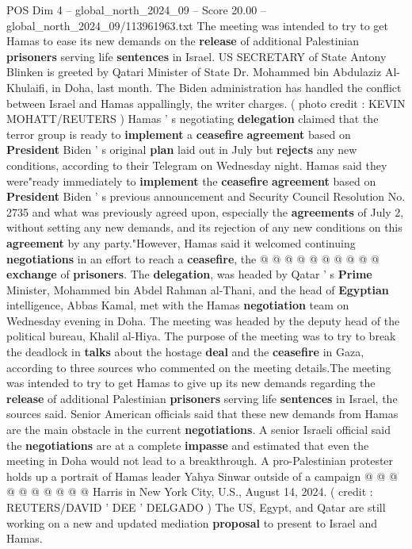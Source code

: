 \begin{textsample}{POS Dim 4 – global\_north\_2024\_09 – Score 20.00 – global\_north\_2024\_09/113961963.txt}  \label{ex:f4_pos_315}
The meeting was intended to try to get Hamas to ease its new demands on the \textbf{release} of additional Palestinian \textbf{prisoners} serving life \textbf{sentences} in Israel.
US SECRETARY of State Antony Blinken is greeted by Qatari Minister of State Dr.
Mohammed bin Abdulaziz Al-Khulaifi, in Doha, last month.
The Biden administration has handled the conflict between Israel and Hamas appallingly, the writer charges. ( photo credit : KEVIN MOHATT/REUTERS ) Hamas ' s negotiating \textbf{delegation} claimed that the terror group is ready to \textbf{implement} a \textbf{ceasefire} \textbf{agreement} based on \textbf{President} Biden ' s original \textbf{plan} laid out in July but \textbf{rejects} any new conditions, according to their Telegram on Wednesday night.
Hamas said they were"ready immediately to \textbf{implement} the \textbf{ceasefire} \textbf{agreement} based on \textbf{President} Biden ' s previous announcement and Security Council Resolution No. 2735 and what was previously agreed upon, especially the \textbf{agreements} of July 2, without setting any new demands, and its rejection of any new conditions on this \textbf{agreement} by any party."However, Hamas said it welcomed continuing \textbf{negotiations} in an effort to reach a \textbf{ceasefire}, the @ @ @ @ @ @ @ @ @ @ \textbf{exchange} of \textbf{prisoners}.
The \textbf{delegation}, was headed by Qatar ' s \textbf{Prime} Minister, Mohammed bin Abdel Rahman al-Thani, and the head of \textbf{Egyptian} intelligence, Abbas Kamal, met with the Hamas \textbf{negotiation} team on Wednesday evening in Doha.
The meeting was headed by the deputy head of the political bureau, Khalil al-Hiya.
The purpose of the meeting was to try to break the deadlock in \textbf{talks} about the hostage \textbf{deal} and the \textbf{ceasefire} in Gaza, according to three sources who commented on the meeting details.The meeting was intended to try to get Hamas to give up its new demands regarding the \textbf{release} of additional Palestinian \textbf{prisoners} serving life \textbf{sentences} in Israel, the sources said.
Senior American officials said that these new demands from Hamas are the main obstacle in the current \textbf{negotiations}.
A senior Israeli official said the \textbf{negotiations} are at a complete \textbf{impasse} and estimated that even the meeting in Doha would not lead to a breakthrough.
A pro-Palestinian protester holds up a portrait of Hamas leader Yahya Sinwar outside of a campaign @ @ @ @ @ @ @ @ @ @ Harris in New York City, U.S., August 14, 2024. ( credit : REUTERS/DAVID ' DEE ' DELGADO ) The US, Egypt, and Qatar are still working on a new and updated mediation \textbf{proposal} to present to Israel and Hamas.

\end{textsample}
